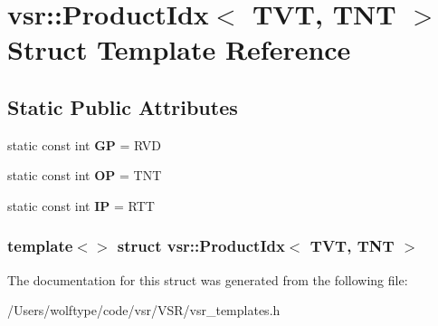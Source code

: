 \hypertarget{structvsr_1_1_product_idx_3_01_t_v_t_00_01_t_n_t_01_4}{\section{vsr\-:\-:Product\-Idx$<$ T\-V\-T, T\-N\-T $>$ Struct Template Reference}
\label{structvsr_1_1_product_idx_3_01_t_v_t_00_01_t_n_t_01_4}
}
\subsection*{Static Public Attributes}
\begin{DoxyCompactItemize}
\item 
\hypertarget{structvsr_1_1_product_idx_3_01_t_v_t_00_01_t_n_t_01_4_ad6df7abfb1c5c8241175eeecc6862569}{static const int {\bfseries G\-P} = R\-V\-D}\label{structvsr_1_1_product_idx_3_01_t_v_t_00_01_t_n_t_01_4_ad6df7abfb1c5c8241175eeecc6862569}

\item 
\hypertarget{structvsr_1_1_product_idx_3_01_t_v_t_00_01_t_n_t_01_4_a9b6befc2fc0d030be693856557070196}{static const int {\bfseries O\-P} = T\-N\-T}\label{structvsr_1_1_product_idx_3_01_t_v_t_00_01_t_n_t_01_4_a9b6befc2fc0d030be693856557070196}

\item 
\hypertarget{structvsr_1_1_product_idx_3_01_t_v_t_00_01_t_n_t_01_4_ae6674d50319838b39f82cabe498d3a19}{static const int {\bfseries I\-P} = R\-T\-T}\label{structvsr_1_1_product_idx_3_01_t_v_t_00_01_t_n_t_01_4_ae6674d50319838b39f82cabe498d3a19}

\end{DoxyCompactItemize}
\subsubsection*{template$<$$>$ struct vsr\-::\-Product\-Idx$<$ T\-V\-T, T\-N\-T $>$}



The documentation for this struct was generated from the following file\-:\begin{DoxyCompactItemize}
\item 
/\-Users/wolftype/code/vsr/\-V\-S\-R/vsr\-\_\-templates.\-h\end{DoxyCompactItemize}
